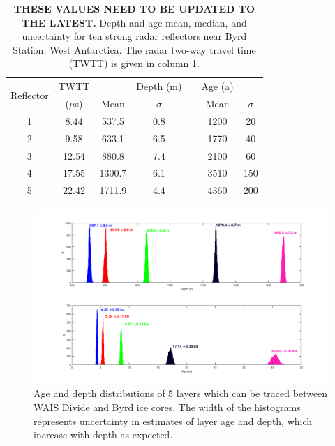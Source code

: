 \begin{table}[h]
\centering
\begin{tabular}{ c c c c c c c}
\cline{1-7}
\multirow{2}{*}{Reflector} & TWTT& & Depth (m) & & Age  (a)& \\   
& ($\mu$s)& Mean  & $\sigma$ & &Mean  & $\sigma$ \\
\cline{3-4} \cline{6-7}
 1 & 8.44    & 537.5  &  0.8 & &1200 & 20   \\
 2 & 9.58    & 633.1  &  6.5 & &1770 & 40   \\
 3 & 12.54   & 880.8  &  7.4 & &2100 & 60   \\
 4 & 17.55   & 1300.7 &  6.1 & &3510 & 150  \\
 5 & 22.42   & 1711.9 &  4.4 & &4360 & 200  \\
\cline{1-7}
\end{tabular}
\captionsetup{width=.9\textwidth}
\caption{\textbf{THESE VALUES NEED TO BE UPDATED TO THE LATEST.} Depth and age mean, median, and uncertainty for ten strong radar reflectors near Byrd Station, West Antarctica. The radar two-way travel time (TWTT) is given in column 1. }
\label{tab:depthunc}
\end{table}




\begin{figure}[h]
\centering
\includegraphics[scale=0.5]{figures/agedepthhisto}
\caption[]{Age and depth distributions of 5 layers which can be traced between WAIS Divide and Byrd ice cores. The width of the histograms represents uncertainty in estimates of layer age and depth, which increase with depth as expected. }
\label{fig:layer_agedepth}
\end{figure}

